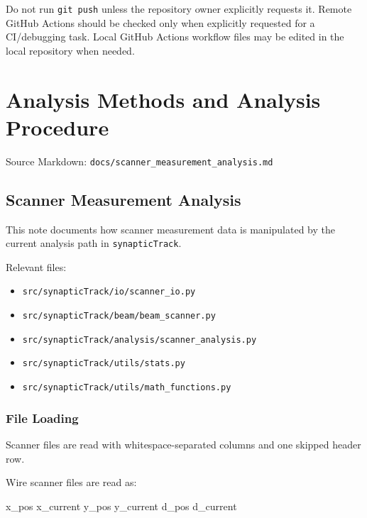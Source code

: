 \documentclass[
]{article}
\newenvironment{Shaded}{}{}
\newcommand{\NormalTok}[1]{#1}
\providecommand{\tightlist}{%
  \setlength{\itemsep}{0pt}\setlength{\parskip}{0pt}}
\begin{document}
Do not run \texttt{git\ push} unless the repository owner explicitly
requests it. Remote GitHub Actions should be checked only when
explicitly requested for a CI/debugging task. Local GitHub Actions
workflow files may be edited in the local repository when needed.

\hypertarget{analysis-methods-and-analysis-procedure}{%
\section{Analysis Methods and Analysis
Procedure}\label{analysis-methods-and-analysis-procedure}}

Source Markdown: \texttt{docs/scanner\_measurement\_analysis.md}

\hypertarget{scanner-measurement-analysis}{%
\subsection{Scanner Measurement
Analysis}\label{scanner-measurement-analysis}}

This note documents how scanner measurement data is manipulated by the
current analysis path in \texttt{synapticTrack}.

Relevant files:

\begin{itemize}
\tightlist
\item
  \texttt{src/synapticTrack/io/scanner\_io.py}
\item
  \texttt{src/synapticTrack/beam/beam\_scanner.py}
\item
  \texttt{src/synapticTrack/analysis/scanner\_analysis.py}
\item
  \texttt{src/synapticTrack/utils/stats.py}
\item
  \texttt{src/synapticTrack/utils/math\_functions.py}
\end{itemize}

\hypertarget{file-loading}{%
\subsubsection{File Loading}\label{file-loading}}

Scanner files are read with whitespace-separated columns and one skipped
header row.

Wire scanner files are read as:

\begin{Shaded}
\begin{Highlighting}[]
\NormalTok{x\_pos x\_current y\_pos y\_current d\_pos d\_current}
\end{Highlighting}
\end{Shaded}
\end{document}
